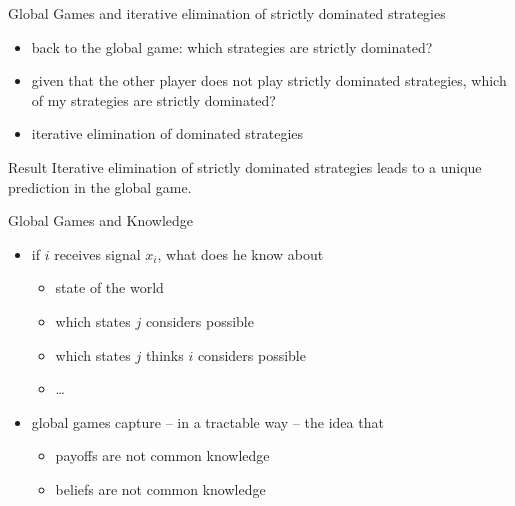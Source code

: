 \documentclass[bigger,allowframebreaks]{beamer}
\begin{document}
\begin{frame}[label=sec-1-5]{Global Games and iterative elimination of strictly dominated strategies}
\begin{itemize}
\item back to the global game: which strategies are strictly dominated?
\end{itemize}
\begin{itemize}
\item given that the other player does not play strictly dominated strategies, which of my strategies are strictly dominated?
\item iterative elimination of dominated strategies
\end{itemize}
\begin{block}{Result}
Iterative elimination of strictly dominated strategies leads to a unique prediction in the global game.
\end{block}
\end{frame}


\begin{frame}[label=sec-1-6]{Global Games and Knowledge}
\begin{itemize}
\item if $i$ receives signal $x_i$, what does he know about
\begin{itemize}
\item state of the world
\item which states $j$ considers possible
\item which states $j$ thinks $i$ considers possible
\item \dots{}
\end{itemize}
\end{itemize}
\begin{itemize}
\item global games capture -- in a tractable way -- the idea that 
\begin{itemize}
\item payoffs are not common knowledge
\item beliefs are not common knowledge
\end{itemize}
\end{itemize}
\end{frame}
\end{document}
